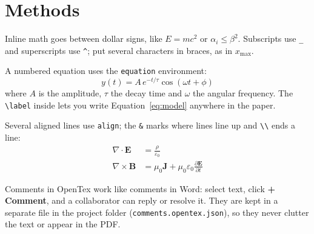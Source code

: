 
\section{Methods}
\label{sec:methods}

Inline math goes between dollar signs, like $E = mc^2$ or $\alpha_i \leq \beta^2$.
Subscripts use \verb|_| and superscripts use \verb|^|; put several characters in braces, as in $x_{\mathrm{max}}$.

A numbered equation uses the \texttt{equation} environment:
\begin{equation}
  y(t) = A \, e^{-t/\tau} \cos(\omega t + \phi)
  \label{eq:model}
\end{equation}
where $A$ is the amplitude, $\tau$ the decay time and $\omega$ the angular frequency.
The \verb|\label| inside lets you write Equation~\ref{eq:model} anywhere in the paper.

Several aligned lines use \texttt{align}; the \verb|&| marks where lines line up and \verb|\\| ends a line:
\begin{align}
  \nabla \cdot \mathbf{E} &= \frac{\rho}{\varepsilon_0} \\
  \nabla \times \mathbf{B} &= \mu_0 \mathbf{J} + \mu_0 \varepsilon_0 \frac{\partial \mathbf{E}}{\partial t}
\end{align}

Comments in OpenTex work like comments in Word: select text, click \textbf{+ Comment}, and a collaborator can reply or resolve it.
They are kept in a separate file in the project folder (\texttt{comments.opentex.json}), so they never clutter the text or appear in the PDF.

